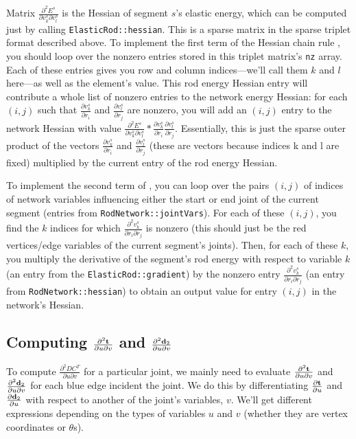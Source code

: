 \documentclass[10pt]{article}
\providecommand{\pder}[2]{\frac{\partial #1}{\partial #2}}
\providecommand{\spder}[3]{\frac{\partial^2 #1}{\partial #2 \partial #3}}
\renewcommand{\vec}[1]{{\bf #1}}
\newcommand\pr[1]{\prettyref{#1}}
\def\d{\vec{d}}
\def\t{\vec{t}}
\begin{document}
Matrix $\spder{E^s}{v^s_k}{v^s_l}$ is the Hessian of segment $s$'s elastic
energy, which can be computed just by calling \texttt{ElasticRod::hessian}. This is
a sparse matrix in the sparse triplet format described above. To implement
the first term of the Hessian chain rule \pr{eqn:hessian_chain_rule},
you should loop over the nonzero entries stored in this triplet matrix's
\texttt{nz} array. Each of these entries gives you row and column indices---we'll call them
$k$ and $l$ here---as well as the element's value. This rod energy Hessian entry will contribute a whole list
of nonzero entries to the network energy Hessian:
for each $(i, j)$ such that $\pder{v^s_k}{r_i}$ and $\pder{v^s_l}{r_j}$ are nonzero,
you will add an $(i, j)$ entry to the network Hessian with value
$
\spder{E^s}{v^s_k}{v^s_l} * \pder{v^s_k}{r_i} \pder{v^s_l}{r_j}
$.
Essentially, this is just the sparse outer product of the vectors $\pder{v^s_k}{r_i}$ and $\pder{v^s_l}{r_j}$
(these are vectors because indices k and l are fixed) multiplied by the current entry of the rod energy Hessian.

To implement the second term of \pr{eqn:hessian_chain_rule}, you can loop over
the pairs $(i, j)$ of indices of network variables influencing either
the start or end joint of the current segment
(entries from \texttt{RodNetwork::jointVars}). For each of these $(i, j)$, you
find the $k$ indices for which
$\spder{v^s_k}{r_i}{r_j}$ is nonzero (this should just be the red vertices/edge
variables of the current segment's joints). Then, for each of these $k$, you
multiply the derivative of the segment's rod energy with respect to variable
$k$ (an entry from the \texttt{ElasticRod::gradient})
by the nonzero entry $\spder{v^s_k}{r_i}{r_j}$ (an entry from
\texttt{RodNetwork::hessian}) to obtain an output value for entry $(i, j)$ in
the network's Hessian.

\subsection{Computing $\spder{\t}{u}{v}$ and $\spder{\d_2}{u}{v}$}
To compute $\spder{DC^T}{u}{v}$ for a particular joint, we mainly
need to evaluate $\spder{\t}{u}{v}$ and $\spder{\d_2}{u}{v}$ for each blue edge
incident the joint. We do this by differentiating $\pder{\t}{u}$ and
$\pder{\d_2}{u}$ with respect to another of the joint's variables, $v$. We'll
get different expressions depending on the types of variables $u$ and $v$
(whether they are vertex coordinates or $\theta$s).
\end{document}
